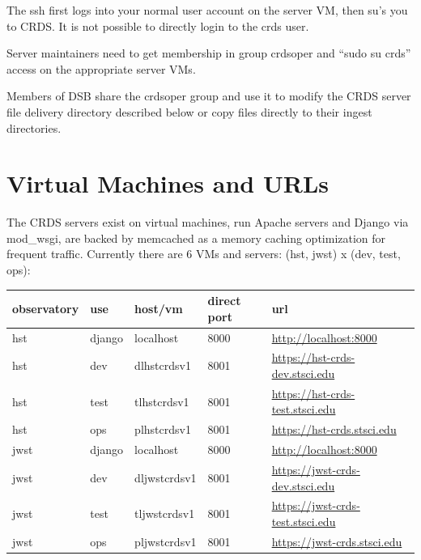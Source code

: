 \documentclass[letterpaper,10pt,english]{sphinxmanual}
\begin{document}
The ssh first logs into your normal user account on the server VM, then su's you to CRDS.   It is not possible
to directly login to the crds user.

Server maintainers need to get membership in group crdsoper and ``sudo su crds'' access on
the appropriate server VMs.

Members of DSB share the crdsoper group and use it to modify the CRDS server file delivery
directory described below or copy files directly to their ingest directories.


\section{Virtual Machines and URLs}
\label{server_guide:virtual-machines-and-urls}
The CRDS servers exist on virtual machines,  run Apache servers and Django via mod\_wsgi,
are backed by memcached as a memory caching optimization for frequent traffic.  Currently
there are 6 VMs and servers:  (hst, jwst) x (dev, test, ops):

\begin{tabulary}{\linewidth}{|L|L|L|L|L|}
\hline
\textsf{\relax 
observatory
} & \textsf{\relax 
use
} & \textsf{\relax 
host/vm
} & \textsf{\relax 
direct port
} & \textsf{\relax 
url
}\\
\hline
hst
 & 
django
 & 
localhost
 & 
8000
 & 
\href{http://localhost:8000}{http://localhost:8000}
\\

hst
 & 
dev
 & 
dlhstcrdsv1
 & 
8001
 & 
\href{https://hst-crds-dev.stsci.edu}{https://hst-crds-dev.stsci.edu}
\\

hst
 & 
test
 & 
tlhstcrdsv1
 & 
8001
 & 
\href{https://hst-crds-test.stsci.edu}{https://hst-crds-test.stsci.edu}
\\

hst
 & 
ops
 & 
plhstcrdsv1
 & 
8001
 & 
\href{https://hst-crds.stsci.edu}{https://hst-crds.stsci.edu}
\\

jwst
 & 
django
 & 
localhost
 & 
8000
 & 
\href{http://localhost:8000}{http://localhost:8000}
\\

jwst
 & 
dev
 & 
dljwstcrdsv1
 & 
8001
 & 
\href{https://jwst-crds-dev.stsci.edu}{https://jwst-crds-dev.stsci.edu}
\\

jwst
 & 
test
 & 
tljwstcrdsv1
 & 
8001
 & 
\href{https://jwst-crds-test.stsci.edu}{https://jwst-crds-test.stsci.edu}
\\

jwst
 & 
ops
 & 
pljwstcrdsv1
 & 
8001
 & 
\href{https://jwst-crds.stsci.edu}{https://jwst-crds.stsci.edu}
\\
\hline\end{tabulary}
\end{document}
